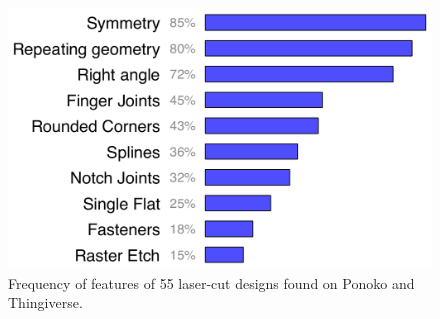 \begin{figure}[t]
  \centering
  \includegraphics[width=0.6\linewidth]{img/ponoko-graph.pdf}
  \caption[Feature Analysis of Laser Cut Items]{Frequency of features
    of 55 laser-cut designs found on Ponoko and Thingiverse.}
  \label{fig:ponoko}
\end{figure}
